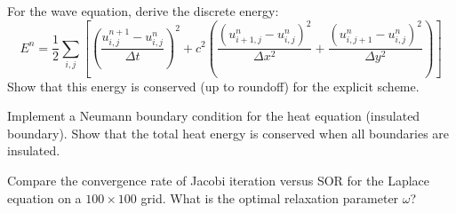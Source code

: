 \begin{exercise}
For the wave equation, derive the discrete energy:
\[
E^n = \frac{1}{2}\sum_{i,j} \left[\left(\frac{u_{i,j}^{n+1} - u_{i,j}^n}{\Delta t}\right)^2
+ c^2\left(\frac{(u_{i+1,j}^n - u_{i,j}^n)^2}{\Delta x^2} + \frac{(u_{i,j+1}^n - u_{i,j}^n)^2}{\Delta y^2}\right)\right]
\]
Show that this energy is conserved (up to roundoff) for the explicit scheme.
\end{exercise}

\begin{exercise}
Implement a Neumann boundary condition for the heat equation (insulated boundary).
Show that the total heat energy is conserved when all boundaries are insulated.
\end{exercise}

\begin{exercise}
Compare the convergence rate of Jacobi iteration versus SOR for the Laplace equation
on a $100 \times 100$ grid. What is the optimal relaxation parameter $\omega$?
\end{exercise}